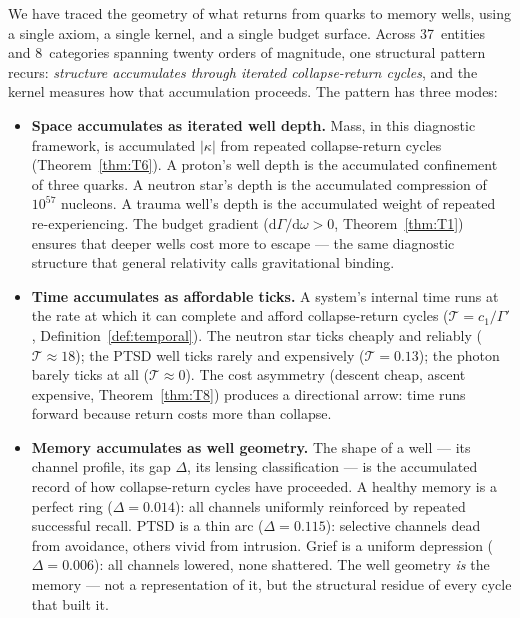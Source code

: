 \documentclass[
  aps,
  prd,
  twocolumn,
  superscriptaddress,
  nofootinbib,
  floatfix
]{revtex4-2}
\newcommand{\Gam}{\Gamma}
\newcommand{\dd}{\mathrm{d}}
\begin{document}
We have traced the geometry of what returns from quarks to
memory wells, using a single axiom, a single kernel, and a
single budget surface.  Across 37~entities and 8~categories
spanning twenty orders of magnitude, one structural pattern
recurs: \emph{structure accumulates through iterated
collapse-return cycles}, and the kernel measures how that
accumulation proceeds.  The pattern has three modes:

\begin{itemize}
\item \textbf{Space accumulates as iterated well depth.}
  Mass, in this diagnostic framework, is accumulated
  $|\kappa|$ from repeated collapse-return cycles
  (Theorem~\ref{thm:T6}).  A proton's well depth is the
  accumulated confinement of three quarks.  A neutron star's
  depth is the accumulated compression of $10^{57}$
  nucleons.  A trauma well's depth is the accumulated weight
  of repeated re-experiencing.  The budget gradient
  ($\dd\Gam/\dd\omega > 0$, Theorem~\ref{thm:T1}) ensures
  that deeper wells cost more to escape --- the same
  diagnostic structure that general relativity calls
  gravitational binding.

\item \textbf{Time accumulates as affordable ticks.}
  A system's internal time runs at the rate at which it
  can complete and afford collapse-return cycles
  ($\mathcal{T} = c_1/\Gam'$, Definition~\ref{def:temporal}).
  The neutron star ticks cheaply and reliably
  ($\mathcal{T} \approx 18$); the PTSD well ticks rarely
  and expensively ($\mathcal{T} = 0.13$); the photon barely
  ticks at all ($\mathcal{T} \approx 0$).  The cost asymmetry
  (descent cheap, ascent expensive, Theorem~\ref{thm:T8})
  produces a directional arrow: time runs forward because
  return costs more than collapse.

\item \textbf{Memory accumulates as well geometry.}
  The shape of a well --- its channel profile, its gap
  $\Delta$, its lensing classification --- is the accumulated
  record of how collapse-return cycles have proceeded.  A
  healthy memory is a perfect ring ($\Delta = 0.014$): all
  channels uniformly reinforced by repeated successful
  recall.  PTSD is a thin arc ($\Delta = 0.115$): selective
  channels dead from avoidance, others vivid from intrusion.
  Grief is a uniform depression ($\Delta = 0.006$): all
  channels lowered, none shattered.  The well geometry \emph{is}
  the memory --- not a representation of it, but the
  structural residue of every cycle that built it.
\end{itemize}
\end{document}
